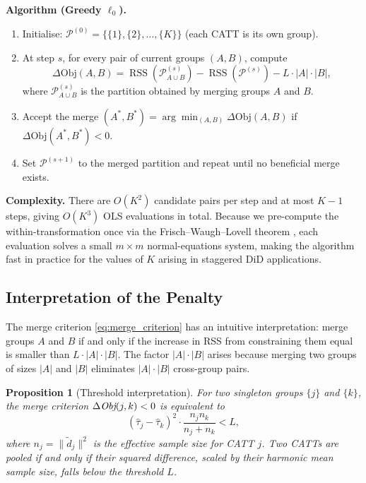 \documentclass[margin=3in, 12pt]{article}
\newtheorem{proposition}{Proposition}
\DeclareMathOperator{\RSS}{RSS}
\newcommand{\1}{\mathbbm{1}}
\begin{document}
\vspace{4pt}
\noindent\textbf{Algorithm (Greedy $\ell_0$).}
\begin{enumerate}[nosep, leftmargin=1.5em]
  \item Initialise: $\mathcal{P}^{(0)} = \{\{1\},\{2\},\ldots,\{K\}\}$
    (each CATT is its own group).
  \item At step $s$, for every pair of current groups $(A, B)$, compute
    \begin{equation}
      \Delta\text{Obj}(A,B) = \RSS(\mathcal{P}^{(s)}_{A\cup B})
        - \RSS(\mathcal{P}^{(s)}) - L\cdot |A|\cdot |B|,
      \label{eq:merge_criterion}
    \end{equation}
    where $\mathcal{P}^{(s)}_{A\cup B}$ is the partition obtained by
    merging groups $A$ and $B$.
  \item Accept the merge $(A^*, B^*) = \arg\min_{(A,B)}\Delta\text{Obj}(A,B)$
    if $\Delta\text{Obj}(A^*, B^*) < 0$.
  \item Set $\mathcal{P}^{(s+1)}$ to the merged partition and repeat
    until no beneficial merge exists.
\end{enumerate}

\textbf{Complexity.} There are $O(K^2)$ candidate pairs per step and at most
$K-1$ steps, giving $O(K^3)$ OLS evaluations in total. Because we
pre-compute the within-transformation once via the Frisch--Waugh--Lovell
theorem \citep{frisch1933}, each evaluation solves a small $m \times m$
normal-equations system, making the algorithm fast in practice for the
values of $K$ arising in staggered DiD applications.

\subsection{Interpretation of the Penalty}

The merge criterion \eqref{eq:merge_criterion} has an intuitive
interpretation: merge groups $A$ and $B$ if and only if the increase in RSS
from constraining them equal is smaller than $L \cdot |A| \cdot |B|$.
The factor $|A| \cdot |B|$ arises because merging two groups of sizes
$|A|$ and $|B|$ eliminates $|A| \cdot |B|$ cross-group pairs.

\begin{proposition}[Threshold interpretation]
  \label{prop:threshold}
  For two singleton groups $\{j\}$ and $\{k\}$, the merge criterion
  $\Delta\emph{Obj}(j,k) < 0$ is equivalent to
  \begin{equation}
    (\hat\tau_j - \hat\tau_k)^2 \cdot \frac{n_j n_k}{n_j + n_k} < L,
  \end{equation}
  where $n_j = \|\tilde{d}_j\|^2$ is the effective sample size for CATT $j$.
  Two CATTs are pooled if and only if their squared difference, scaled by
  their harmonic mean sample size, falls below the threshold $L$.
\end{proposition}
\end{document}

